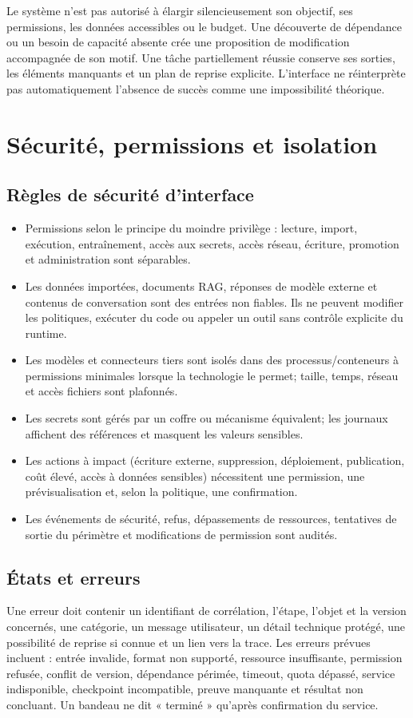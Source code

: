 \documentclass[11pt,a4paper]{article}
\begin{document}
Le système n'est pas autorisé à élargir silencieusement son objectif, ses permissions, les données accessibles ou le budget. Une découverte de dépendance ou un besoin de capacité absente crée une proposition de modification accompagnée de son motif. Une tâche partiellement réussie conserve ses sorties, les éléments manquants et un plan de reprise explicite. L'interface ne réinterprète pas automatiquement l'absence de succès comme une impossibilité théorique.

\section{Sécurité, permissions et isolation}
\subsection{Règles de sécurité d'interface}
\begin{itemize}
\item Permissions selon le principe du moindre privilège : lecture, import, exécution, entraînement, accès aux secrets, accès réseau, écriture, promotion et administration sont séparables.
\item Les données importées, documents RAG, réponses de modèle externe et contenus de conversation sont des entrées non fiables. Ils ne peuvent modifier les politiques, exécuter du code ou appeler un outil sans contrôle explicite du runtime.
\item Les modèles et connecteurs tiers sont isolés dans des processus/conteneurs à permissions minimales lorsque la technologie le permet; taille, temps, réseau et accès fichiers sont plafonnés.
\item Les secrets sont gérés par un coffre ou mécanisme équivalent; les journaux affichent des références et masquent les valeurs sensibles.
\item Les actions à impact (écriture externe, suppression, déploiement, publication, coût élevé, accès à données sensibles) nécessitent une permission, une prévisualisation et, selon la politique, une confirmation.
\item Les événements de sécurité, refus, dépassements de ressources, tentatives de sortie du périmètre et modifications de permission sont audités.
\end{itemize}

\subsection{États et erreurs}
Une erreur doit contenir un identifiant de corrélation, l'étape, l'objet et la version concernés, une catégorie, un message utilisateur, un détail technique protégé, une possibilité de reprise si connue et un lien vers la trace. Les erreurs prévues incluent : entrée invalide, format non supporté, ressource insuffisante, permission refusée, conflit de version, dépendance périmée, timeout, quota dépassé, service indisponible, checkpoint incompatible, preuve manquante et résultat non concluant. Un bandeau ne dit « terminé » qu'après confirmation du service.
\end{document}
